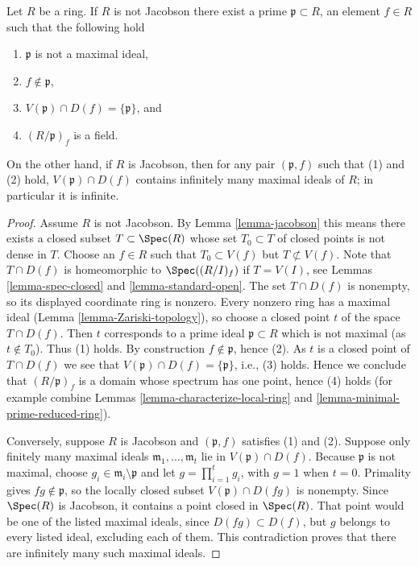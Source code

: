 \begin{lemma}
\label{lemma-characterize-jacobson}
Let $R$ be a ring. If $R$ is not Jacobson there exist
a prime $\mathfrak p \subset R$, an element $f \in R$
such that the following hold
\begin{enumerate}
\item $\mathfrak p$ is not a maximal ideal,
\item $f \not \in \mathfrak p$,
\item $V(\mathfrak p) \cap D(f) = \{\mathfrak p\}$, and
\item $(R/\mathfrak p)_f$ is a field.
\end{enumerate}
On the other hand, if $R$ is Jacobson, then for any pair $(\mathfrak p, f)$
such that (1) and (2) hold, $V(\mathfrak p)\cap D(f)$ contains
infinitely many maximal ideals of $R$; in particular it is infinite.
\end{lemma}

\begin{proof}
Assume $R$ is not Jacobson.
By Lemma \ref{lemma-jacobson} this means there exists a
closed subset $T \subset \Spec(R)$
whose set $T_0 \subset T$ of closed points is not dense in $T$.
Choose an $f \in R$ such that $T_0 \subset V(f)$ but
$T \not \subset V(f)$. Note that $T \cap D(f)$
is homeomorphic to $\Spec((R/I)_f)$ if $T = V(I)$, see
Lemmas \ref{lemma-spec-closed} and \ref{lemma-standard-open}.
The set $T\cap D(f)$ is nonempty, so its displayed coordinate ring
is nonzero. Every nonzero ring has a maximal ideal
(Lemma \ref{lemma-Zariski-topology}), so choose a closed point $t$
of the space $T\cap D(f)$. Then $t$ corresponds to a prime ideal
$\mathfrak p \subset R$ which is not maximal (as $t \not \in T_0$).
Thus (1) holds. By construction $f \not \in \mathfrak p$, hence (2).
As $t$ is a closed point of $T \cap D(f)$ we see that
$V(\mathfrak p) \cap D(f) = \{\mathfrak p\}$, i.e., (3) holds. Hence we
conclude that $(R/\mathfrak p)_f$ is a domain whose
spectrum has one point, hence (4) holds
(for example combine Lemmas \ref{lemma-characterize-local-ring} and
\ref{lemma-minimal-prime-reduced-ring}).

\medskip\noindent
Conversely, suppose $R$ is Jacobson and $(\mathfrak p,f)$ satisfies
(1) and (2). Suppose only finitely many maximal ideals
$\mathfrak m_1,\ldots,\mathfrak m_t$ lie in
$V(\mathfrak p)\cap D(f)$. Because $\mathfrak p$ is not maximal,
choose $g_i\in\mathfrak m_i\setminus\mathfrak p$ and let
$g=\prod_{i=1}^t g_i$, with $g=1$ when $t=0$.
Primality gives $fg\notin\mathfrak p$, so the locally closed subset
$V(\mathfrak p)\cap D(fg)$ is nonempty. Since $\Spec(R)$ is Jacobson,
it contains a point closed in $\Spec(R)$. That point would be one of
the listed maximal ideals, since $D(fg)\subset D(f)$, but $g$ belongs
to every listed ideal, excluding each of them. This contradiction
proves that there are infinitely many such maximal ideals.
\end{proof}